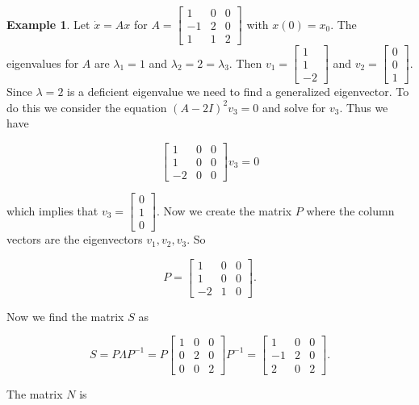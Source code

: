 \documentclass[12pt]{article}
\theoremstyle{definition}
\newtheorem*{example}{Example}
\begin{document}
\begin{example}
Let $\dot x = Ax$ for $A = \begin{bmatrix} 1 & 0 & 0 \\ -1 & 2 & 0 \\ 1 & 1 & 2 \end{bmatrix}$ with $x(0) = x_0$. The
eigenvalues for $A$ are $\lambda_1 = 1$ and $\lambda_2 = 2 = \lambda_3$. Then
$v_1 = \begin{bmatrix} 1 \\ 1 \\ -2 \end{bmatrix}$ and $v_2 = \begin{bmatrix} 0 \\ 0 \\ 1 \end{bmatrix}$. Since
$\lambda = 2$ is a deficient eigenvalue we need to find a generalized eigenvector. To do this we consider the equation
$(A - 2I)^2 v_3 = 0$ and solve for $v_3$. Thus we have

\[
\begin{bmatrix}
1 & 0 & 0 \\
1 & 0 & 0 \\
-2 & 0 & 0
\end{bmatrix} v_3 = 0
\]

which implies that $v_3 = \begin{bmatrix} 0 \\ 1 \\ 0 \end{bmatrix}$. Now we create the matrix $P$ where the column vectors
are the eigenvectors $v_1, v_2, v_3$. So

\[
P =
\begin{bmatrix}
1 & 0 & 0 \\
1 & 0 & 0 \\
-2 & 1 & 0
\end{bmatrix}.
\]

Now we find the matrix $S$ as

\[
S = P\Lambda P^{-1} = P 
\begin{bmatrix}
1 & 0 & 0 \\
0 & 2 & 0 \\
0 & 0 & 2
\end{bmatrix}
P^{-1} = 
\begin{bmatrix}
1 & 0 & 0 \\
-1 & 2 & 0 \\
2 & 0 & 2
\end{bmatrix}.
\]

The matrix $N$ is


\end{example}
\end{document}
